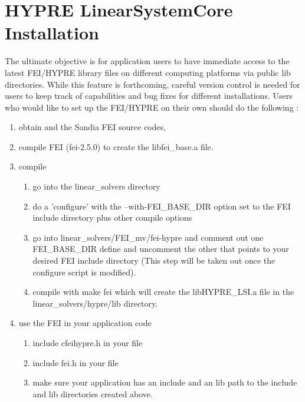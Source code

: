 \section{HYPRE LinearSystemCore Installation}

The ultimate objective is for application users to have immediate access
to the latest FEI/HYPRE library files on different computing platforms
via public {\sf lib} directories.  While this feature is forthcoming, careful 
version control is needed for users to keep track of capabilities and bug fixes 
for different installations.  Users who would like to set up the FEI/HYPRE
on their own should do the following :

\begin{enumerate}

\item obtain \hypre{} and the Sandia FEI source codes,
\item compile {\sf FEI} (fei-2.5.0) to create the {\sf libfei\_base.a} file.
\item compile \hypre{} 
\begin{enumerate}
\item go into the {\sf linear\_solvers} directory
\item do a 'configure' with the {\sf --with-FEI\_BASE\_DIR} option set to
      the {\sf FEI} include directory plus other compile options
\item go into {\sf linear\_solvers/FEI\_mv/fei-hypre} and comment out one
      {\sf FEI\_BASE\_DIR} define and uncomment the other that points to
      your desired {\sf FEI} include directory (This step will be taken
      out once the configure script is modified).
\item compile with {\sf make fei} which will create the {\sf libHYPRE\_LSI.a}
      file in the {\sf linear\_solvers/hypre/lib} directory.
\end{enumerate}
\item use the {\sf FEI} in your application code
\begin{enumerate}
\item include {\sf cfei\-hypre.h} in your file 
\item include {\sf fei.h} in your file 
\item make sure your application has an {\sf include} and an {\sf lib} path 
      to the {\sf include} and {\sf lib} directories created above. 
\end{enumerate}

\end{enumerate}

